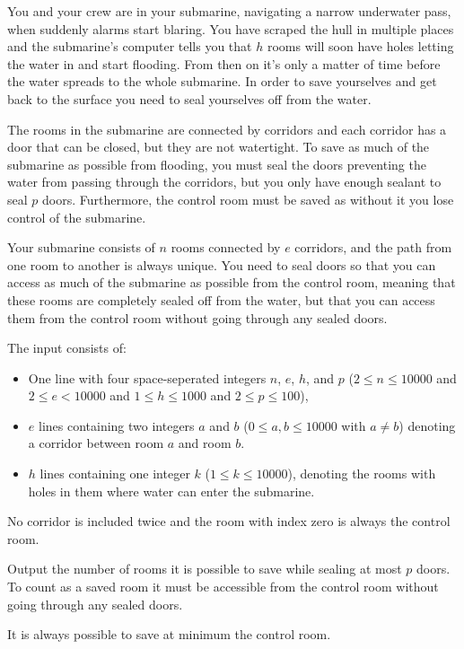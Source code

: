 
You and your crew are in your submarine, navigating a narrow underwater pass, when suddenly alarms start blaring.
You have scraped the hull in multiple places and the submarine's computer tells you that $h$ rooms will soon have holes letting the water in and start flooding. 
From then on it's only a matter of time before the water spreads to the whole submarine. 
In order to save yourselves and get back to the surface you need to seal yourselves off from the water.

The rooms in the submarine are connected by corridors and each corridor has a door that can be closed, but they are not watertight. 
To save as much of the submarine as possible from flooding, you must seal the doors preventing the water from passing through the corridors, 
but you only have enough sealant to seal $p$ doors. Furthermore, the control room must be saved as without it you lose control of the submarine.

Your submarine consists of $n$ rooms connected by $e$ corridors, and the path from one room to another is always unique. 
You need to seal doors so that you can access as much of the submarine as possible from the control room, 
meaning that these rooms are completely sealed off from the water, but that you can access them from the control room without going through any sealed doors.


\begin{Input}
    The input consists of:
    \begin{itemize}
        \item One line with four space-seperated integers $n$, $e$, $h$, and $p$ ($2\leq n \leq 10000$ and $2\leq e < 10000$ and $1\leq h \leq 1000$ and $2\leq p \leq 100$), 
        \item $e$ lines containing two integers $a$ and $b$ ($0\leq a,b \leq 10000$ with $a\neq b$) denoting a corridor between room $a$ and room $b$.
        \item $h$ lines containing one integer $k$ ($1\leq k \leq 10000$), denoting the rooms with holes in them where water can enter the submarine.
    \end{itemize}
    No corridor is included twice and the room with index zero is always the control room.
\end{Input}

\begin{Output}
    Output the number of rooms it is possible to save while sealing at most $p$ doors. 
    To count as a saved room it must be accessible from the control room without going through any sealed doors. 
    
    It is always possible to save at minimum the control room.
\end{Output}
